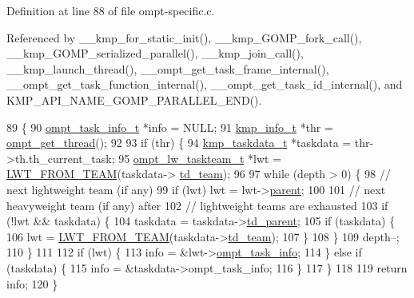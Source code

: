 Definition at line 88 of file ompt-\/specific.\-c.



Referenced by \-\_\-\-\_\-kmp\-\_\-for\-\_\-static\-\_\-init(), \-\_\-\-\_\-kmp\-\_\-\-G\-O\-M\-P\-\_\-fork\-\_\-call(), \-\_\-\-\_\-kmp\-\_\-\-G\-O\-M\-P\-\_\-serialized\-\_\-parallel(), \-\_\-\-\_\-kmp\-\_\-join\-\_\-call(), \-\_\-\-\_\-kmp\-\_\-launch\-\_\-thread(), \-\_\-\-\_\-ompt\-\_\-get\-\_\-task\-\_\-frame\-\_\-internal(), \-\_\-\-\_\-ompt\-\_\-get\-\_\-task\-\_\-function\-\_\-internal(), \-\_\-\-\_\-ompt\-\_\-get\-\_\-task\-\_\-id\-\_\-internal(), and K\-M\-P\-\_\-\-A\-P\-I\-\_\-\-N\-A\-M\-E\-\_\-\-G\-O\-M\-P\-\_\-\-P\-A\-R\-A\-L\-L\-E\-L\-\_\-\-E\-N\-D().


\begin{DoxyCode}
89 \{
90     \hyperlink{structompt__task__info__t}{ompt\_task\_info\_t} *info = NULL;
91     \hyperlink{kmp_8h_a194859801fe16b326efe34501a37c30a}{kmp\_info\_t} *thr = \hyperlink{ompt-specific_8h_ae3f900aeae1828089c356b1db2be6fee}{ompt\_get\_thread}();
92 
93     \textcolor{keywordflow}{if} (thr) \{
94         \hyperlink{structkmp__taskdata}{kmp\_taskdata\_t}  *taskdata = thr->th.th\_current\_task;
95         \hyperlink{structompt__lw__taskteam__s}{ompt\_lw\_taskteam\_t} *lwt = \hyperlink{ompt-specific_8c_a9dc12459c8279002a0191618e32c5366}{LWT\_FROM\_TEAM}(taskdata->
      \hyperlink{structkmp__taskdata_a2ca48086b6f95cea53c615b83a94e424}{td\_team});
96 
97         \textcolor{keywordflow}{while} (depth > 0) \{
98             \textcolor{comment}{// next lightweight team (if any)}
99             \textcolor{keywordflow}{if} (lwt) lwt = lwt->\hyperlink{structompt__lw__taskteam__s_ac945aa2df678ab63f63a5f23ea796974}{parent};
100 
101             \textcolor{comment}{// next heavyweight team (if any) after}
102             \textcolor{comment}{// lightweight teams are exhausted}
103             \textcolor{keywordflow}{if} (!lwt && taskdata) \{
104                 taskdata = taskdata->\hyperlink{structkmp__taskdata_a47e9134b90866241cb795112acf9dabb}{td\_parent};
105                 \textcolor{keywordflow}{if} (taskdata) \{
106                     lwt = \hyperlink{ompt-specific_8c_a9dc12459c8279002a0191618e32c5366}{LWT\_FROM\_TEAM}(taskdata->\hyperlink{structkmp__taskdata_a2ca48086b6f95cea53c615b83a94e424}{td\_team});
107                 \}
108             \}
109             depth--;
110         \}
111 
112         \textcolor{keywordflow}{if} (lwt) \{
113             info = &lwt->\hyperlink{structompt__lw__taskteam__s_aef7e0a0307d5b34644ddaa0cc7e9ba46}{ompt\_task\_info};
114         \} \textcolor{keywordflow}{else} \textcolor{keywordflow}{if} (taskdata) \{
115             info = &taskdata->ompt\_task\_info;
116         \}
117     \}
118 
119     \textcolor{keywordflow}{return} info;
120 \}
\end{DoxyCode}
